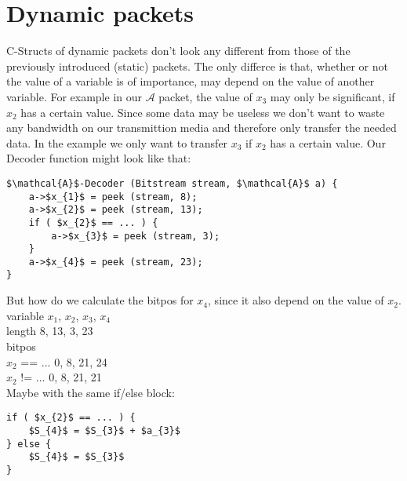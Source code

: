\documentclass{article}
\begin{document}
	\section{Dynamic packets}
		C-Structs of dynamic packets don't look any different from those of the previously introduced (static) packets.
		The only differce is that, whether or not the value of a variable is of importance, may depend on the value of another variable.	
		For example in our $\mathcal{A}$ packet, the value of $x_{3}$ may only be significant, if $x_{2}$ has a certain value.
		Since some data may be useless we don't want to waste any bandwidth on our transmittion media and therefore only transfer the needed data.
		In the example we only want to transfer $x_{3}$ if $x_{2}$ has a certain value.
		Our Decoder function might look like that:

		\begin{lstlisting}[mathescape]
$\mathcal{A}$-Decoder (Bitstream stream, $\mathcal{A}$ a) {
	a->$x_{1}$ = peek (stream, 8);
	a->$x_{2}$ = peek (stream, 13);
	if ( $x_{2}$ == ... ) {
		a->$x_{3}$ = peek (stream, 3);
	}
	a->$x_{4}$ = peek (stream, 23);
}
		\end{lstlisting}

		But how do we calculate the bitpos for $x_{4}$, since it also depend on the value of $x_{2}$.\\
		variable   $x_{1}$, $x_{2}$, $x_{3}$, $x_{4}$\\
		length        8, 13, 3, 23\\
		bitpos\\
		$x_{2}$ == ...  0, 8, 21, 24\\
		$x_{2}$ != ...  0, 8, 21, 21\\
		Maybe with the same if/else block:

		\begin{lstlisting}[mathescape]
if ( $x_{2}$ == ... ) {
	$S_{4}$ = $S_{3}$ + $a_{3}$
} else {
	$S_{4}$ = $S_{3}$
}
		\end{lstlisting}
\end{document}
